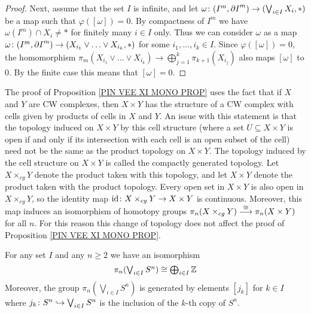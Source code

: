\begin{proof}
Next, assume that the set $I$ is infinite, and let 
$\omega\colon (I^{m}, {\partial I}^{m}) \to (\bigvee_{i\in I} X_{i}, \ast)$ be a map 
such that $\varphi([\omega]) = 0$. 
By compactness of $I^{m}$ we have 
$\omega(I^{m})\cap X_{i}\neq \ast$ for finitely many $i\in I$ only. Thus 
we can consider $\omega$ as a map 
$\omega\colon (I^{m}, {\partial I}^{m}) \to 
(X_{i_{1}} \vee{\dots}\vee X_{i_{k}}, \ast)$ for some $i_{1}, \dots, i_{k} \in I$. 
Since $\varphi([\omega]) = 0$, the homomorphism 
$\pi_{m}(X_{i_{1}} \vee{\dots}\vee X_{i_{k}}) \to \bigoplus_{j=1}^{k} \pi_{k+1}(X_{i_{j}})$
also maps $[\omega]$ to $0$. By the finite case this means that $[\omega] = 0$.
\end{proof}


\begin{note}
The proof of Proposition \ref{PIN VEE XI MONO PROP} uses the fact that if 
$X$ and $Y$ are CW complexes, then $X\times Y$ has the structure of a CW 
complex with cells given by products of cells in $X$ and $Y$. An issue with 
this statement is that the topology induced on $X\times Y$ by this cell structure
(where a set $U\subseteq X\times Y$ is open if and only if its intersection with 
each cell is an open subset of the cell) need not be the same as the product 
topology on $X\times Y$. The topology induced by the cell structure 
on $X\times Y$ is called the compactly generated topology. Let $X\times_{cg} Y$
denote the product taken with this topology, and let $X\times Y$ denote the product 
taken with the product topology. Every open set in $X\times Y$ is also open in 
$X\times_{cg} Y$, so the identity map $\mathrm{id} \colon X\times_{cg} Y \to X\times Y$
is continuous. Moreover, this map induces an isomorphism of homotopy groups 
$\pi_{n}(X\times_{cg}Y)\overset{\cong}{\longrightarrow}\pi_{n}(X\times Y)$ for all $n$. 
For this reason this change of topology does not affect the proof of 
Proposition \ref{PIN VEE XI MONO PROP}. 
\end{note}


\begin{corollary}
\label{WEDGE SN PIN COR}
For any set $I$ and any $n\geq 2$ we have an isomorphism 
\[
\textstyle
\pi_{n}(\bigvee_{i\in I} S^{n})\cong \bigoplus_{i\in I}{\mathbb Z}
\]
Moreover, the group $\pi_{n}(\bigvee_{i\in I} S^{n})$ is generated by
elements $[j_{k}]$ for $k\in I$ where $j_{k}\colon S^{n}\hookrightarrow \bigvee_{i\in I} S^{n}$
is the inclusion of the $k$-th copy of $S^{n}$. 
\end{corollary}


